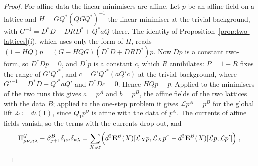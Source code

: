 \documentclass[11pt]{preprint}
\numberwithin{equation}{section}
\theoremstyle{definition}
\theoremstyle{remark}
\theoremstyle{plain}
\begin{document}
\begin{proof}
For affine data the linear minimisers are affine. Let $p$ be an affine field on a lattice and $H = GQ^*(QGQ^*)^{-1}$ the linear minimiser at the trivial background, with $G^{-1} = D^*D + DRD^* + Q^*aQ$ there. The identity of Proposition~\ref{prop:two-lattices}(i), which uses only the form of $H$, reads $(1 - HQ)p = (G - HQG)(D^*D + DRD^*)p$. Now $Dp$ is a constant two-form, so $D^*Dp = 0$, and $D^*p$ is a constant $c$, which $R$ annihilates: $P = 1 - R$ fixes the range of $G'Q'^*$, and $c = G'Q'^*(aQ'c)$ at the trivial background, where $G'^{-1} = D^*D + Q'^*aQ'$ and $D^*Dc = 0$. Hence $HQp = p$. Applied to the minimisers of the two runs this gives $a = p^A$ and $b = p^B$, the affine fields of the two lattices with the data $B$; applied to the one-step problem it gives $\mathcal Lp^A = p^B$ for the global lift $\mathcal L \coloneqq d\iota(1)$, since $Q_1p^B$ is affine with the data of $p^A$. The currents of affine fields vanish, so the terms with the currents drop out, and
\begin{equation}\label{eq:moment-defect}
    \Pi^{\mathcal G}_{\mu\nu,\kappa\lambda} - \beta^B_{j+1}\delta_{\mu\nu}\delta_{\kappa\lambda} = \sum_{X \ni z}\Bigl(d^2\mathbf E^B(X)[\mathcal L_Xp, \mathcal L_Xp'] - d^2\mathbf E^B(X)[\mathcal Lp, \mathcal Lp']\Bigr)\;,
\end{equation}

\end{proof}
\end{document}
